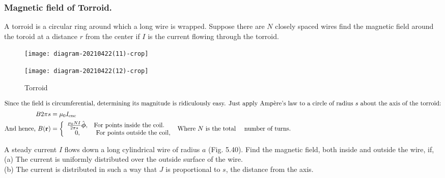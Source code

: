 \subsubsection{Magnetic field of Torroid. }
A torroid is a circular ring around which a long wire is wrapped. Suppose there are $N$ closely spaced wires find the magnetic field around the toroid at a distance $r$ from the center if $I$ is the current flowing through the torroid.
\begin{figure}[H]
\begin{minipage}{0.45\textwidth}
	\texttt{[image: diagram-20210422(11)-crop]}
\end{minipage}
\begin{minipage}{0.45\textwidth}
		\texttt{[image: diagram-20210422(12)-crop]}
\end{minipage}
\caption{Torroid}
\end{figure}
\begin{align*}
\intertext{Since the field is circumferential, determining its magnitude is ridiculously easy. Just apply Ampère's law to a circle of radius $s$ about the axis of the torroid:}
B 2 \pi s&=\mu_{0} I_{\text {enc }}\\
\text{And hence,}\ {B}(\mathbf{r})&=\left\{\begin{array}{cl}
\frac{\mu_{0} N I}{2 \pi s} \hat{\boldsymbol{\phi}}, & \text {For points inside the coil. } \\
0, & \text { For points outside the coil, }
\end{array}\right.
\text{Where $N$ is the total}&\text{ number of turns.}
\end{align*}
\begin{exercise}
	 A steady current $I$ flows down a long cylindrical wire of radius $a$ (Fig. 5.40). Find the magnetic field, both inside and outside the wire, if,
	\\(a) The current is uniformly distributed over the outside surface of the wire.
	\\(b) The current is distributed in such a way that $J$ is proportional to $s$, the distance from the axis.
\end{exercise}
